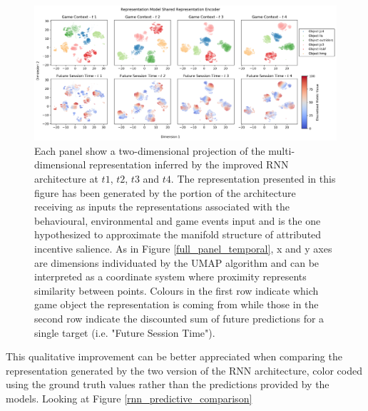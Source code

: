 \begin{figure}[!htb]
\centering
\includegraphics[width=\textwidth]{images/chapter_4/RNN_env_even_0_lstm_layer_shared_Future Session Time.png}
\caption[\textbf{Lower dimensional representation of the shared latent representations generated by the improved version of the RNN architecture}]{Each panel show a two-dimensional projection of the multi-dimensional representation inferred by the improved RNN architecture at $t1$, $t2$, $t3$ and $t4$. The representation presented in this figure has been generated by the portion of the architecture receiving as inputs the representations associated with the behavioural, environmental and game events input and is the one hypothesized to approximate the manifold structure of attributed incentive salience. As in Figure \ref{full_panel_temporal}, x and y axes are dimensions individuated by the UMAP algorithm and can be interpreted as a coordinate system where proximity represents similarity between points. Colours in the first row indicate which game object the representation is coming from while those in the second row indicate the discounted sum of future predictions for a single target (i.e. "Future Session Time").}
\label{rnn_env_even_full_shared}
\end{figure}

This qualitative improvement can be better appreciated when comparing the representation generated by the two version of the RNN architecture, color coded using the ground truth values rather than the predictions provided by the models. Looking at Figure \ref{rnn_predictive_comparison}

